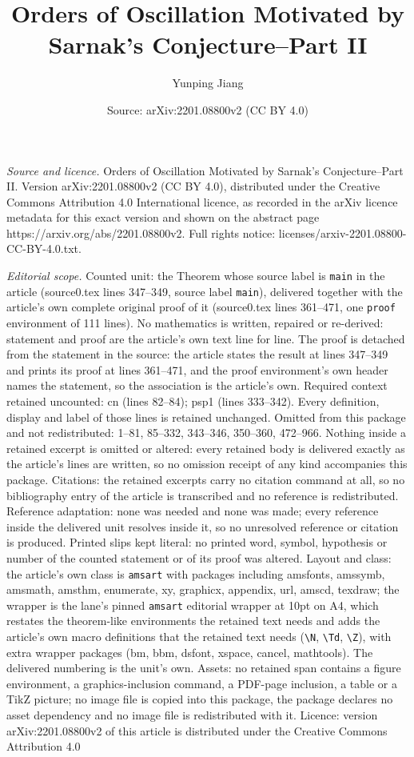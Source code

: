 \documentclass[10pt,a4paper]{amsart}
\title[Orders of Oscillation Motivated by Sarnak's Conjecture--Part]{Orders of Oscillation Motivated by Sarnak's Conjecture--Part II}
\author{Yunping Jiang}
\date{Source: arXiv:2201.08800v2 (CC BY 4.0)}
\begin{document}
\maketitle

\noindent\emph{Source and licence.} Orders of Oscillation Motivated by Sarnak's Conjecture--Part II. Version arXiv:2201.08800v2 (CC BY 4.0), distributed under the Creative Commons Attribution 4.0 International licence, as recorded in the arXiv licence metadata for this exact version and shown on the abstract page https://arxiv.org/abs/2201.08800v2. Full rights notice: licenses/arxiv-2201.08800-CC-BY-4.0.txt.\par\smallskip

\noindent\textit{Editorial scope.} Counted unit: the Theorem whose source label is \texttt{main} in the article (source0.tex lines 347--349, source label \texttt{main}), delivered together with the article's own complete original proof of it (source0.tex lines 361--471, one \texttt{proof} environment of 111 lines). No mathematics is written, repaired or re-derived: statement and proof are the article's own text line for line. The proof is detached from the statement in the source: the article states the result at lines 347--349 and prints its proof at lines 361--471, and the proof environment's own header names the statement, so the association is the article's own. Required context retained uncounted: cn (lines 82--84); psp1 (lines 333--342). Every definition, display and label of those lines is retained unchanged. Omitted from this package and not redistributed: 1--81, 85--332, 343--346, 350--360, 472--966. Nothing inside a retained excerpt is omitted or altered: every retained body is delivered exactly as the article's lines are written, so no omission receipt of any kind accompanies this package. Citations: the retained excerpts carry no citation command at all, so no bibliography entry of the article is transcribed and no reference is redistributed. Reference adaptation: none was needed and none was made; every reference inside the delivered unit resolves inside it, so no unresolved reference or citation is produced. Printed slips kept literal: no printed word, symbol, hypothesis or number of the counted statement or of its proof was altered. Layout and class: the article's own class is \texttt{amsart} with packages including amsfonts, amssymb, amsmath, amsthm, enumerate, xy, graphicx, appendix, url, amscd, texdraw; the wrapper is the lane's pinned \texttt{amsart} editorial wrapper at 10pt on A4, which restates the theorem-like environments the retained text needs and adds the article's own macro definitions that the retained text needs (\texttt{\textbackslash N}, \texttt{\textbackslash Td}, \texttt{\textbackslash Z}), with extra wrapper packages (bm, bbm, dsfont, xspace, cancel, mathtools). The delivered numbering is the unit's own. Assets: no retained span contains a figure environment, a graphics-inclusion command, a PDF-page inclusion, a table or a TikZ picture; no image file is copied into this package, the package declares no asset dependency and no image file is redistributed with it. Licence: version arXiv:2201.08800v2 of this article is distributed under the Creative Commons Attribution 4.0 
\end{document}
